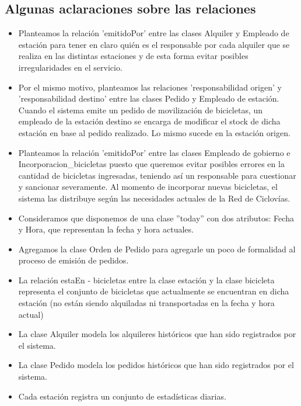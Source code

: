 \subsection{Algunas aclaraciones sobre las relaciones}

\begin{itemize}
	\item Planteamos la relación 'emitidoPor' entre las clases Alquiler y Empleado de estación para tener en claro quién es el responsable por cada alquiler que se realiza en las distintas estaciones y de esta forma evitar posibles irregularidades en el servicio.
	\item Por el mismo motivo, planteamos las relaciones 'responsabilidad origen' y 'responsabilidad destino' entre las clases Pedido y Empleado de estación. Cuando el sistema emite un pedido de movilización de bicicletas, un empleado de la estación destino se encarga de modificar el stock de dicha estación en base al pedido realizado. Lo mismo sucede en la estación origen.
	\item Planteamos la relación 'emitidoPor' entre las clases Empleado de gobierno e Incorporacion\_bicicletas puesto que queremos evitar posibles errores en la cantidad de bicicletas ingresadas, teniendo así un responsable para cuestionar y sancionar severamente. Al momento de incorporar nuevas bicicletas, el sistema las distribuye según las necesidades actuales de la Red de Ciclovías. 
	\item Consideramos que disponemos de una clase ''today'' con dos atributos: Fecha y Hora, que representan la fecha
	y hora actuales.
	\item Agregamos la clase Orden de Pedido para agregarle un poco de formalidad al proceso de emisión de pedidos.
	\item La relación estaEn - bicicletas entre la clase estación y la clase bicicleta representa el conjunto de 
	bicicletas que actualmente se encuentran en dicha estación (no están siendo alquiladas ni transportadas en
	la fecha y hora actual)
	\item La clase Alquiler modela los alquileres históricos que han sido registrados por el sistema.
	\item La clase Pedido modela los pedidos históricos que han sido registrados por el sistema.
	\item Cada estación registra un conjunto de estadísticas diarias.
\end{itemize}

